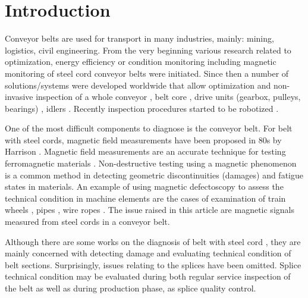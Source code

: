 \documentclass[applsci,article,preprint,moreauthors,pdftex]{Definitions/mdpi}
\begin{document}
\section{Introduction}
Conveyor belts are used for transport in many industries, mainly: mining, logistics, civil engineering. From the very beginning various research related to optimization, energy efficiency or condition monitoring including magnetic monitoring of steel cord conveyor belts were initiated. Since then a number of solutions/systems were developed worldwide that allow optimization and non-invasive inspection of a whole conveyor \cite{8621649, Stefaniak_CMMNO2018, Carvalho2020, Mu2020, Yao2020, Zhang2020, Rudawska20201}, belt core \cite{harrison1985magnetic, kuzik1996scanning, yulin1999development, xiao2012electromagnetic, blazej2014high, fedorko2016possibilities}, drive units (gearbox, pulleys, bearings) \cite{Grzesiek2020,obuchowski2014recent,hebda2020selection,Wodecki201886}, idlers \cite{Molnar2020, Szrek2020, Liu20202689, Stehlikova2020, LIU2018277, krol_diagnostyka, krol_miningscience}. Recently inspection procedures started to be robotized \cite{zimrozMPES2019, Carvalho2020, Szrek2020}.

One of the most difficult components to diagnose is the conveyor belt. For belt with steel cords, magnetic field measurements have been proposed in 80s by Harrison \cite{harrison1985magnetic}. Magnetic field measurements are an accurate technique for testing ferromagnetic materials \cite{wang2012review}. Non-destructive testing using a magnetic phenomenon is a common method in detecting geometric discontinuities (damages) and fatigue states in materials. An example of using magnetic defectoscopy to assess the technical condition in machine elements are the cases of examination of train wheels \cite{le2013nondestructive}, pipes \cite{jarvis2016current}, wire ropes \cite{yan2017online}. The issue raised in this article are magnetic signals measured from steel cords in a conveyor belt.

Although there are some works on the diagnosis of belt with steel cord \cite{harrison1985magnetic,kuzik1996scanning,yulin1999development,xiao2012electromagnetic,blazej2014high,fedorko2016possibilities}, they are mainly concerned with detecting damage and evaluating technical condition of belt sections. Surprisingly, issues relating to the splices have been omitted. Splice technical condition may be evaluated during both regular service inspection of the belt as well as during production phase, as splice quality control. 
\end{document}
